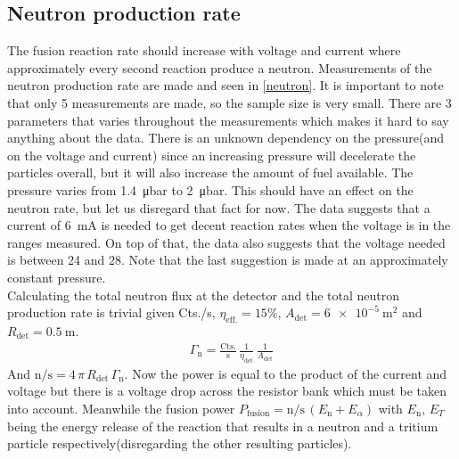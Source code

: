 \subsection{Neutron production rate}
The fusion reaction rate should increase with voltage and current where approximately every second reaction produce a neutron. Measurements of the neutron production rate are made and seen in \cref{neutron}. It is important to note that only 5 measurements are made, so the sample size is very small. There are 3 parameters that varies throughout the measurements which makes it hard to say anything about the data. There is an unknown dependency on the pressure(and on the voltage and current) since an increasing pressure will decelerate the particles overall, but it will also increase the amount of fuel available. The pressure varies from \SI{1.4}{\micro\bar} to \SI{2}{\micro\bar}. This should have an effect on the neutron rate, but let us disregard that fact for now. The data suggests that a current of \SI{6}{\milli\ampere} is needed to get decent reaction rates when the voltage is in the ranges measured. On top of that, the data also suggests that the voltage needed is between \SI{24}{\volts} and \SI{28}{\volts}. Note that the last suggestion is made at an approximately constant pressure.\\
Calculating the total neutron flux at the detector and the total neutron production rate is trivial given Cts./s,  \(\eta_{\mathrm{eff.}}=15\%\), \(A_{\mathrm{det}}=\SI{6e-5}{\meter\squared}\) and \(R_{\mathrm{det}}=\SI{0.5}{\meter}\).
\begin{align}
	\Gamma_{\mathrm{n}}=\frac{\mathrm{Cts.}}{\mathrm{s}}\,\frac{1}{\eta_{\mathrm{det}}}\,\frac{1}{A_{\mathrm{det}}}
\end{align}
And \(\mathrm{n}/\mathrm{s}=4\,\pi\, R_{\mathrm{det}}\,\Gamma_{\mathrm{n}}\). Now the power is equal to the product of the current and voltage but there is a voltage drop across the resistor bank which must be taken into account. Meanwhile the fusion power \(P_{\mathrm{fusion}}=\mathrm{n}/\mathrm{s}\, (E_{\mathrm{n}}+E_{\alpha})\) with \(E_{\mathrm{n}},\,E_{T}\) being the energy release of the reaction that results in a neutron and a tritium particle respectively(disregarding the other resulting particles).
